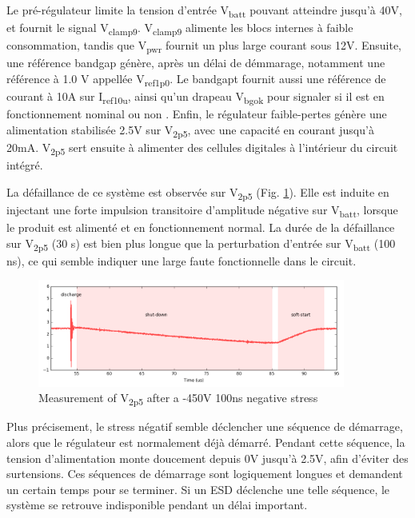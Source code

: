 Le pré-régulateur limite la tension d'entrée V\textsubscript{batt} pouvant atteindre jusqu'à 40V, et fournit le signal V\textsubscript{clamp9}.
V\textsubscript{clamp9} alimente les blocs internes à faible consommation, tandis que V\textsubscript{pwr} fournit un plus large courant sous 12V.
Ensuite, une référence bandgap génère, après un délai de démmarage, notamment une référence à 1.0 V appellée V\textsubscript{ref1p0}.
Le bandgapt fournit aussi une référence de courant à 10\textMu{}A sur I\textsubscript{ref10u}, ainsi qu'un drapeau V\textsubscript{bgok} pour signaler si il est en fonctionnement nominal ou non .
Enfin, le régulateur faible-pertes génère une alimentation stabilisée 2.5V sur V\textsubscript{2p5}, avec une capacité en courant jusqu'à 20mA.
V\textsubscript{2p5} sert ensuite à alimenter des cellules digitales à l'intérieur du circuit intégré.

La défaillance de ce système est observée sur V\textsubscript{2p5} (Fig. \ref{fig:meas-reset-v2p5}).
Elle est induite en injectant une forte impulsion transitoire d'amplitude négative sur V\textsubscript{batt}, lorsque le produit est alimenté et en fonctionnement normal.
La durée de la défaillance sur V\textsubscript{2p5} (30 \textmu{}s) est bien plus longue que la perturbation d'entrée sur V\textsubscript{batt} (100 ns), ce qui semble indiquer une large faute fonctionnelle dans le circuit.

\begin{figure}[!h]
  \centering
  \includegraphics[width=0.9\textwidth]{src/1/figures/v2p5_measure.png}
  \caption{Measurement of V\textsubscript{2p5} after a -450V 100ns negative stress}
  \label{fig:meas-reset-v2p5}
\end{figure}

Plus précisement, le stress négatif semble déclencher une séquence de démarrage, alors que le régulateur est normalement déjà démarré.
Pendant cette séquence, la tension d'alimentation monte doucement depuis 0V jusqu'à 2.5V, afin d'éviter des surtensions.
Ces séquences de démarrage sont logiquement longues et demandent un certain temps pour se terminer.
Si un ESD déclenche une telle séquence, le système se retrouve indisponible pendant un délai important.

